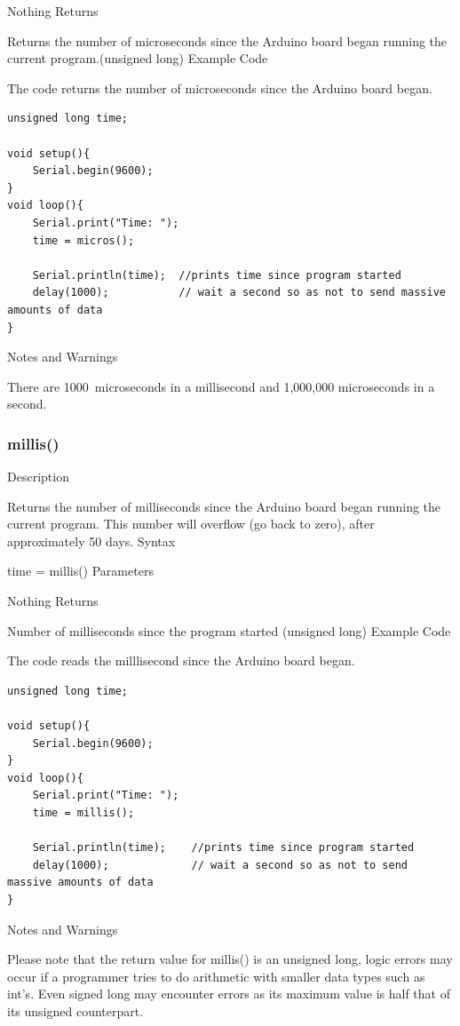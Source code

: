 \documentclass[12pt,a4paper]{report}  %
\begin{document}
Nothing
Returns

Returns the number of microseconds since the Arduino board began running the current program.(unsigned long)
Example Code

The code returns the number of microseconds since the Arduino board began.

\begin{lstlisting}[label=digitalwrite,caption=micros]
unsigned long time;

void setup(){
	Serial.begin(9600);
}
void loop(){
	Serial.print("Time: ");
	time = micros();

	Serial.println(time);  //prints time since program started
	delay(1000);           // wait a second so as not to send massive amounts of data
}
\end{lstlisting}

Notes and Warnings

There are 1000~microseconds in a millisecond and 1,000,000 microseconds in a second.

\subsubsection{millis()}\label{millis}

Description

Returns the number of milliseconds since the Arduino board began running the current program. This number will overflow (go back to zero), after approximately 50 days.
Syntax

time = millis()
Parameters

Nothing
Returns

Number of milliseconds since the program started (unsigned long)
Example Code

The code reads the milllisecond since the Arduino board began.

\begin{lstlisting}[label=digitalwrite,caption=milis]
unsigned long time;

void setup(){
	Serial.begin(9600);
}
void loop(){
	Serial.print("Time: ");
	time = millis();

	Serial.println(time);    //prints time since program started
	delay(1000);             // wait a second so as not to send massive amounts of data
}
\end{lstlisting}

Notes and Warnings

Please note that the return value for millis() is an unsigned long, logic errors may occur if a programmer tries to do arithmetic with smaller data types such as int’s. Even signed long may encounter errors as its maximum value is half that of its unsigned counterpart.
\end{document}
